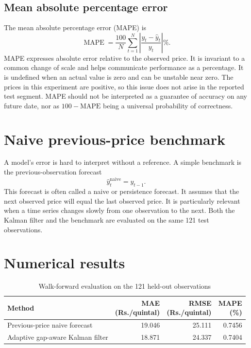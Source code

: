 \documentclass[12pt,a4paper,oneside]{report}
\numberwithin{equation}{chapter}
\numberwithin{figure}{chapter}
\numberwithin{table}{chapter}
\theoremstyle{definition}
\theoremstyle{plain}
\newcommand{\1}{\mathbf{1}}
\newcommand{\hatt}[1]{\widehat{#1}}
\begin{document}
\subsection{Mean absolute percentage error}
The mean absolute percentage error (MAPE) is
\begin{equation}
  \operatorname{MAPE}=\frac{100}{N}\sum_{t=1}^{N}
  \left|\frac{y_t-\hatt{y}_t}{y_t}\right|\%.
  \label{eq:mape}
\end{equation}
MAPE expresses absolute error relative to the observed price. It is invariant to a common change of scale and helps communicate performance as a percentage. It is undefined when an actual value is zero and can be unstable near zero. The prices in this experiment are positive, so this issue does not arise in the reported test segment. MAPE should not be interpreted as a guarantee of accuracy on any future date, nor as $100-\mathrm{MAPE}$ being a universal probability of correctness.

\section{Naive previous-price benchmark}
A model's error is hard to interpret without a reference. A simple benchmark is the previous-observation forecast
\begin{equation}
  \hatt{y}^{\mathrm{naive}}_t=y_{t-1}.
  \label{eq:naive}
\end{equation}
This forecast is often called a naive or persistence forecast. It assumes that the next observed price will equal the last observed price. It is particularly relevant when a time series changes slowly from one observation to the next. Both the Kalman filter and the benchmark are evaluated on the same 121 test observations.

\section{Numerical results}
\begin{table}[H]
\centering
\caption{Walk-forward evaluation on the 121 held-out observations}
\label{tab:metrics}
\small
\begin{tabular}{@{}p{}rrr@{}}
\toprule
Method & \shortstack{MAE\\(Rs./quintal)} & \shortstack{RMSE\\(Rs./quintal)} & \shortstack{MAPE\\(\%)} \\
\midrule
Previous-price naive forecast & 19.046 & 25.111 & 0.7456 \\
Adaptive gap-aware Kalman filter & 18.871 & 24.337 & 0.7404 \\
\bottomrule
\end{tabular}
\end{table}
\end{document}
